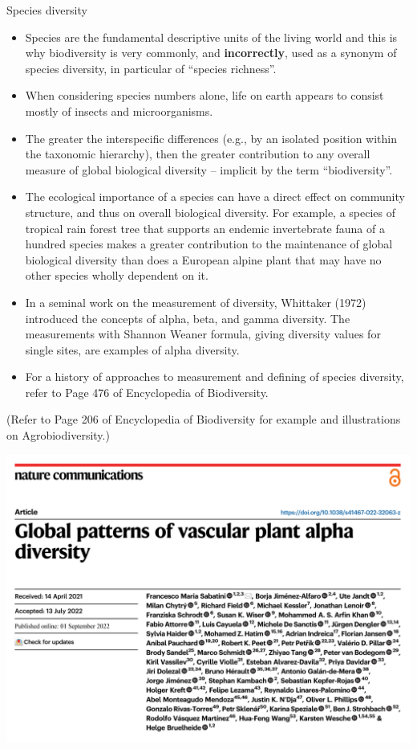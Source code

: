 \documentclass[
  ignorenonframetext,
  aspectratio=169]{beamer}
\providecommand{\tightlist}{%
  \setlength{\itemsep}{0pt}\setlength{\parskip}{0pt}}
\begin{document}
\begin{frame}{Species diversity}
\protect\hypertarget{species-diversity}{}
\begin{itemize}
\tightlist
\item
  Species are the fundamental descriptive units of the living world and
  this is why biodiversity is very commonly, and \textbf{incorrectly},
  used as a synonym of species diversity, in particular of ``species
  richness''.
\item
  When considering species numbers alone, life on earth appears to
  consist mostly of insects and microorganisms.
\item
  The greater the interspecific differences (e.g., by an isolated
  position within the taxonomic hierarchy), then the greater
  contribution to any overall measure of global biological diversity --
  implicit by the term ``biodiversity''.
\item
  The ecological importance of a species can have a direct effect on
  community structure, and thus on overall biological diversity. For
  example, a species of tropical rain forest tree that supports an
  endemic invertebrate fauna of a hundred species makes a greater
  contribution to the maintenance of global biological diversity than
  does a European alpine plant that may have no other species wholly
  dependent on it.
\item
  In a seminal work on the measurement of diversity, Whittaker (1972)
  introduced the concepts of alpha, beta, and gamma diversity. The
  measurements with Shannon Weaner formula, giving diversity values for
  single sites, are examples of alpha diversity.
\item
  For a history of approaches to measurement and defining of species
  diversity, refer to Page 476 of Encyclopedia of Biodiversity.
\end{itemize}

(Refer to Page 206 of Encyclopedia of Biodiversity for example and
illustrations on Agrobiodiversity.)

\begin{center}\includegraphics[width=0.6\linewidth]{../images/global_pattern_alpha_diversity} \end{center}
\end{frame}
\end{document}
